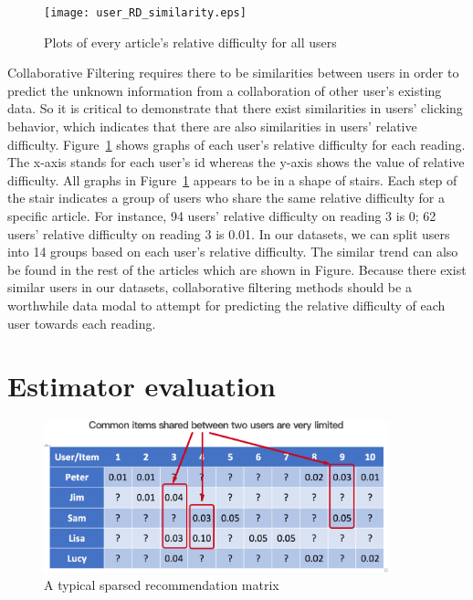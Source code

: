 \begin{figure}[tbp]
 \begin{center}
  \texttt{[image: user\_RD\_similarity.eps]}
 \end{center}
 \caption{\label{figure:user_RD_similarity} Plots of every article's relative difficulty for all users }
\end{figure}

Collaborative Filtering requires there to be similarities between users in order to predict the unknown information from a collaboration of other user's existing data. So it is critical to demonstrate that there exist similarities in users' clicking behavior, which indicates that there are also similarities in users' relative difficulty. Figure~\ref{figure:user_RD_similarity} shows graphs of each user's relative difficulty for each reading. The x-axis stands for each user's id whereas the y-axis shows the value of relative difficulty. All graphs in Figure~\ref{figure:user_RD_similarity} appears to be in a shape of stairs. Each step of the stair indicates a group of users who share the same relative difficulty for a specific article. For instance, 94 users' relative difficulty on reading 3 is 0; 62 users' relative difficulty on reading 3 is 0.01. In our datasets, we can split users into 14 groups based on each user's relative difficulty. The similar trend can also be found in the rest of the articles which are shown in Figure. Because there exist similar users in our datasets, collaborative filtering methods should be a worthwhile data modal to attempt for predicting the relative difficulty of each user towards each reading. 

\section{Estimator evaluation}

\begin{figure}[tbp]
 \begin{center}
  \includegraphics[width=100mm]{matrix_sparse.eps}
 \end{center}
 \caption{\label{figure:matrix_sparse} A typical sparsed recommendation matrix}
\end{figure}

